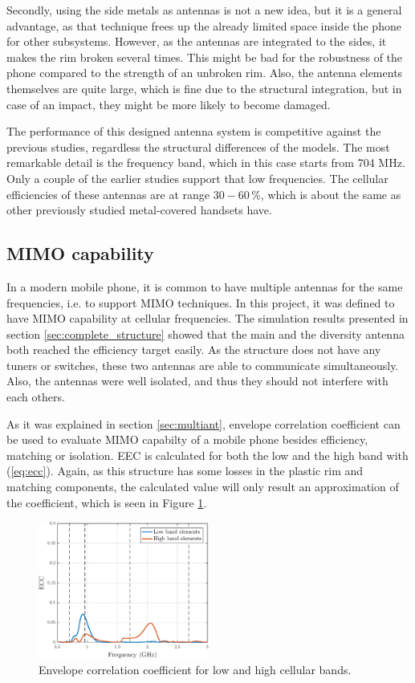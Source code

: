 Secondly, using the side metals as antennas is not a new idea, but it is a general advantage, as that technique frees up the already limited space inside the phone for other subsystems. However, as the antennas are integrated to the sides, it makes the rim broken several times. This might be bad for the robustness of the phone compared to the strength of an unbroken rim. Also, the antenna elements themselves are quite large, which is fine due to the structural integration, but in case of an impact, they might be more likely to become damaged.

The performance of this designed antenna system is competitive against the previous studies, regardless the structural differences of the models. The most remarkable detail is the frequency band, which in this case starts from 704 MHz. Only a couple of the earlier studies support that low frequencies. The cellular efficiencies of these antennas are at range $30-60\,\%$, which is about the same as other previously studied metal-covered handsets have. 


\subsection{MIMO capability}
\label{sec:mimo_cap}
In a modern mobile phone, it is common to have multiple antennas for the same frequencies, i.e. to support MIMO techniques. In this project, it was defined to have MIMO capability at cellular frequencies. The simulation results presented in section \ref{sec:complete_structure} showed that the main and the diversity antenna both reached the efficiency target easily. As the structure does not have any tuners or switches, these two antennas are able to communicate simultaneously. Also, the antennas were well isolated, and thus they should not interfere with each others.

As it was explained in section \ref{sec:multiant}, envelope correlation coefficient can be used to evaluate MIMO capabilty of a mobile phone besides efficiency, matching or isolation. EEC is calculated for both the low and the high band with (\ref{eq:ecc}). Again, as this structure has some losses in the plastic rim and matching components, the calculated value will only result an approximation of the coefficient, which is seen in Figure \ref{fig:ecc}. 
\begin{figure}[H]
    \centering
    \includegraphics[width=0.5\textwidth]{img/ecc.eps}
    \caption{Envelope correlation coefficient for low and high cellular bands.}
    \label{fig:ecc}
\end{figure}

